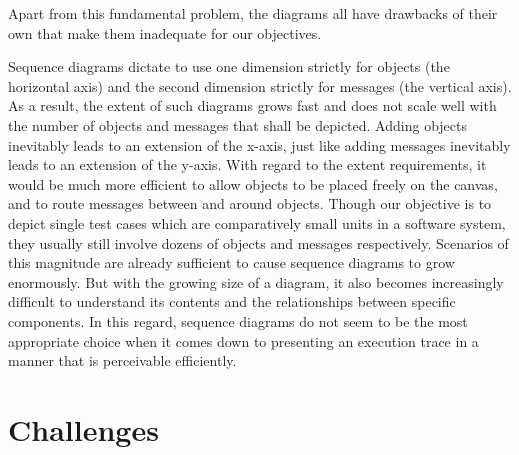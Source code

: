 Apart from this fundamental problem, the diagrams all have drawbacks of their own that make them inadequate for our objectives.

Sequence diagrams dictate to use one dimension strictly for objects (the horizontal axis) and the second dimension strictly for messages (the vertical axis).
As a result, the extent of such diagrams grows fast and does not scale well with the number of objects and messages that shall be depicted.
Adding objects inevitably leads to an extension of the x-axis, just like adding messages inevitably leads to an extension of the y-axis.
With regard to the extent requirements, it would be much more efficient to allow objects to be placed freely on the canvas, and to route messages between and around objects.
Though our objective is to depict single test cases which are comparatively small units in a software system, they usually still involve dozens of objects and messages respectively.
Scenarios of this magnitude are already sufficient to cause sequence diagrams to grow enormously.
But with the growing size of a diagram, it also becomes increasingly difficult to understand its contents and the relationships between specific components.
In this regard, sequence diagrams do not seem to be the most appropriate choice when it comes down to presenting an execution trace in a manner that is perceivable efficiently.

\section{Challenges}